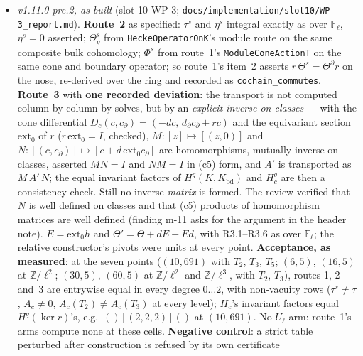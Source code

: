 \documentclass[11pt]{article}
\theoremstyle{remark}
\newcommand{\F}{\mathbb{F}}
\newcommand{\Z}{\mathbb{Z}}
\newcommand{\Fl}{\F_\ell}
\begin{document}
\begin{itemize}
\begin{itemize}
    \emph{v1.11.0-pre.2}: written, \textbf{amended} as the status paragraph says --- the first two
    sentences of (vii) discharged, the third (the adjointness gate this bullet lists as ``not
    lifted'') recorded unavailable over the ring (review finding M-1); [C] v1.10.0 records the same.
  \item \emph{v1.11.0-pre.2, as built} (slot-10 WP-3; \texttt{docs/implementation/slot10/WP-3\_report.md}).
    \textbf{Route~2} as specified: $\tau^{s}$ and $\eta^{s}$ integral exactly as over $\Fl$,
    $\eta^{s}=0$ asserted; $\Theta^{s}_g$ from \texttt{HeckeOperatorOnK}'s module route on the same
    composite bulk cohomology; $\Phi^{s}$ from route~1's \texttt{ModuleConeActionT} on the same cone
    and boundary operator; so route~1's item~2 asserts $r\,\Theta^{s}=\Theta^{\partial}r$ on the nose,
    re-derived over the ring and recorded as \texttt{cochain\_commutes}. \textbf{Route~3} with
    \textbf{one recorded deviation}: the transport is not computed column by column by solves, but by
    an \emph{explicit inverse on classes} --- with the cone differential
    $D_c(c,c_{\partial})=(-dc,\,d_{\partial}c_{\partial}+rc)$ and the equivariant section
    $\mathrm{ext}_0$ of $r$ ($r\,\mathrm{ext}_0=I$, checked), $M\colon[z]\mapsto[(z,0)]$ and
    $N\colon[(c,c_{\partial})]\mapsto[c+d\,\mathrm{ext}_0c_{\partial}]$ are homomorphisms, mutually
    inverse on classes, asserted $MN=I$ and $NM=I$ in (c5) form, and $A'$ is transported as
    $M\,A'\,N$; the equal invariant factors of $H^q(K,K_{\mathrm{bd}})$ and $H^q_c$ are then a
    consistency check. Still no inverse \emph{matrix} is formed. The review verified that $N$ is well
    defined on classes and that (c5) products of homomorphism matrices are well defined (finding
    m-11 asks for the argument in the header note). $E=\mathrm{ext}_0h$ and
    $\Theta'=\Theta+dE+Ed$, with R3.1--R3.6 as over $\Fl$; the relative constructor's pivots were
    units at every point. \textbf{Acceptance, as measured}: at the seven points ($(10,691)$ with
    $T_2$, $T_3$, $T_5$; $(6,5)$, $(16,5)$ at $\Z/\ell^2$; $(30,5)$, $(60,5)$ at $\Z/\ell^2$ and
    $\Z/\ell^3$, with $T_2$, $T_3$), routes 1, 2 and~3 are entrywise equal in every degree
    $0\ldots2$, with non-vacuity rows ($\tau^{s}\ne\tau$, $A_c\ne0$, $A_c(T_2)\ne A_c(T_3)$ at every
    level); $H_c$'s invariant factors equal $H^q(\ker r)$'s, e.g.\ $()\,|\,(2,2,2)\,|\,()$ at
    $(10,691)$. No $U_\ell$ arm: route~1's arms compute none at these cells. \textbf{Negative
    control}: a strict table perturbed after construction is refused by its own certificate

\end{itemize}
\end{itemize}
\end{document}
